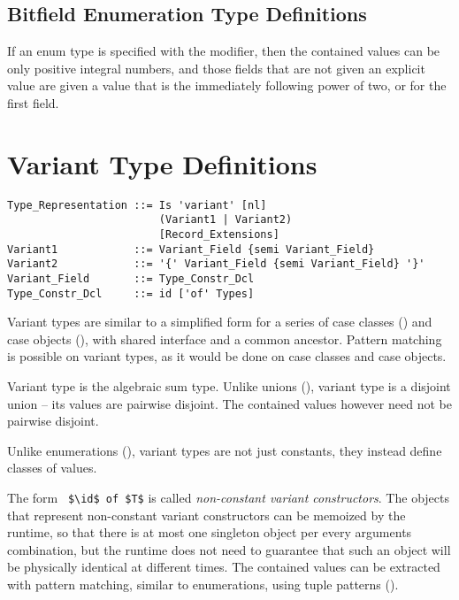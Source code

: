 \subsection{Bitfield Enumeration Type Definitions}

If an enum type is specified with the  modifier, then the contained values can be only positive integral numbers, and those fields that are not given an explicit value are given a value that is the immediately following power of two, or  for the first field. 





\section{Variant Type Definitions}
\label{sec:variant-types}

\syntax\begin{lstlisting}
Type_Representation ::= Is 'variant' [nl]
                        (Variant1 | Variant2)
                        [Record_Extensions]
Variant1            ::= Variant_Field {semi Variant_Field}
Variant2            ::= '{' Variant_Field {semi Variant_Field} '}'
Variant_Field       ::= Type_Constr_Dcl
Type_Constr_Dcl     ::= id ['of' Types]
\end{lstlisting}

Variant types are similar to a simplified form for a series of case classes () and case objects (), with shared interface and a common ancestor. Pattern matching is possible on variant types, as it would be done on case classes and case objects. 

Variant type is the algebraic sum type. Unlike unions (), variant type is a disjoint union -- its values are pairwise disjoint. The contained values however need not be pairwise disjoint. 

Unlike enumerations (), variant types are not just constants, they instead define classes of values. 

The form ~\lstinline!$\id$ of $T$! is called {\em non-constant variant constructors}. The objects that represent non-constant variant constructors can be memoized by the runtime, so that there is at most one singleton object per every arguments combination, but the runtime does not need to guarantee that such an object will be physically identical at different times. The contained values can be extracted with pattern matching, similar to enumerations, using tuple patterns (). 

